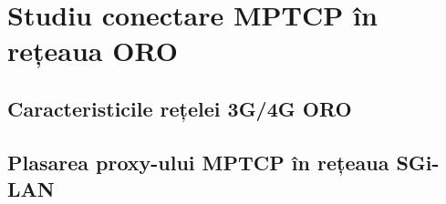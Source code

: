 \chapter{Studiu conectare MPTCP în rețeaua ORO}
\label{sec:oro_arch}

\section{Caracteristicile rețelei 3G/4G ORO}

\section{Plasarea proxy-ului MPTCP în rețeaua SGi-LAN}


